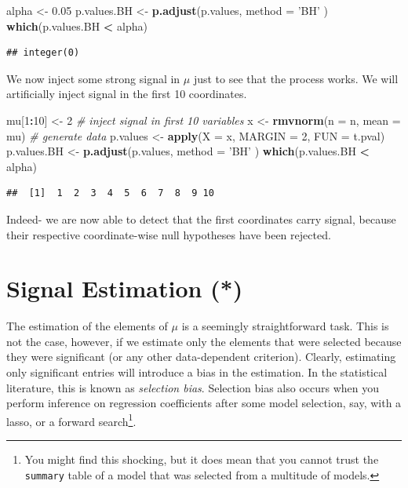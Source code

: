 \documentclass[]{book}
\newenvironment{Shaded}{\begin{snugshade}}{\end{snugshade}}
\newcommand{\CommentTok}[1]{\textcolor[rgb]{0.56,0.35,0.01}{\textit{#1}}}
\newcommand{\DataTypeTok}[1]{\textcolor[rgb]{0.13,0.29,0.53}{#1}}
\newcommand{\DecValTok}[1]{\textcolor[rgb]{0.00,0.00,0.81}{#1}}
\newcommand{\FloatTok}[1]{\textcolor[rgb]{0.00,0.00,0.81}{#1}}
\newcommand{\KeywordTok}[1]{\textcolor[rgb]{0.13,0.29,0.53}{\textbf{#1}}}
\newcommand{\NormalTok}[1]{#1}
\newcommand{\OperatorTok}[1]{\textcolor[rgb]{0.81,0.36,0.00}{\textbf{#1}}}
\newcommand{\StringTok}[1]{\textcolor[rgb]{0.31,0.60,0.02}{#1}}
\theoremstyle{definition}
\theoremstyle{definition}
\theoremstyle{definition}
\theoremstyle{remark}
\begin{document}
\begin{Shaded}
\begin{Highlighting}[]
\NormalTok{alpha <-}\StringTok{ }\FloatTok{0.05}
\NormalTok{p.values.BH <-}\StringTok{ }\KeywordTok{p.adjust}\NormalTok{(p.values, }\DataTypeTok{method =} \StringTok{'BH'}\NormalTok{ )}
\KeywordTok{which}\NormalTok{(p.values.BH }\OperatorTok{<}\StringTok{ }\NormalTok{alpha)}
\end{Highlighting}
\end{Shaded}

\begin{verbatim}
## integer(0)
\end{verbatim}

We now inject some strong signal in \(\mu\) just to see that the process works.
We will artificially inject signal in the first 10 coordinates.

\begin{Shaded}
\begin{Highlighting}[]
\NormalTok{mu[}\DecValTok{1}\OperatorTok{:}\DecValTok{10}\NormalTok{] <-}\StringTok{ }\DecValTok{2} \CommentTok{# inject signal in first 10 variables}
\NormalTok{x <-}\StringTok{ }\KeywordTok{rmvnorm}\NormalTok{(}\DataTypeTok{n =}\NormalTok{ n, }\DataTypeTok{mean =}\NormalTok{ mu) }\CommentTok{# generate data}
\NormalTok{p.values <-}\StringTok{ }\KeywordTok{apply}\NormalTok{(}\DataTypeTok{X =}\NormalTok{ x, }\DataTypeTok{MARGIN =} \DecValTok{2}\NormalTok{, }\DataTypeTok{FUN =}\NormalTok{ t.pval) }
\NormalTok{p.values.BH <-}\StringTok{ }\KeywordTok{p.adjust}\NormalTok{(p.values, }\DataTypeTok{method =} \StringTok{'BH'}\NormalTok{ )}
\KeywordTok{which}\NormalTok{(p.values.BH }\OperatorTok{<}\StringTok{ }\NormalTok{alpha)}
\end{Highlighting}
\end{Shaded}

\begin{verbatim}
##  [1]  1  2  3  4  5  6  7  8  9 10
\end{verbatim}

Indeed- we are now able to detect that the first coordinates carry signal, because their respective coordinate-wise null hypotheses have been rejected.

\hypertarget{signal-estimation}{%
\section{Signal Estimation (*)}\label{signal-estimation}}

The estimation of the elements of \(\mu\) is a seemingly straightforward task.
This is not the case, however, if we estimate only the elements that were selected because they were significant (or any other data-dependent criterion).
Clearly, estimating only significant entries will introduce a bias in the estimation.
In the statistical literature, this is known as \emph{selection bias}.
Selection bias also occurs when you perform inference on regression coefficients after some model selection, say, with a lasso, or a forward search\footnote{You might find this shocking, but it does mean that you cannot trust the \texttt{summary} table of a model that was selected from a multitude of models.}.
\end{document}
